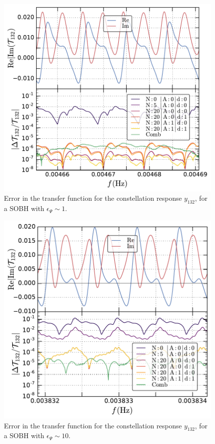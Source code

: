 \documentclass[aps,showpacs,twocolumn,
prd,superscriptaddress,nofootinbib]{revtex4-1}
\begin{document}
\begin{figure}
  \centering
  \includegraphics[width=.98\linewidth]{plots/LISAtransfererrorSOBHepsPsi1y12L_py.pdf}
  \caption{Error in the transfer function for the constellation response $y_{132}$, for a SOBH with $\epsilon_{\Psi}\sim 1$.}
  \label{fig:}
\end{figure}

\begin{figure}
  \centering
  \includegraphics[width=.98\linewidth]{plots/LISAtransfererrorSOBHepsPsi10y12L_py.pdf}
  \caption{Error in the transfer function for the constellation response $y_{132}$, for a SOBH with $\epsilon_{\Psi}\sim 10$.}
  \label{fig:}
\end{figure}
\end{document}
